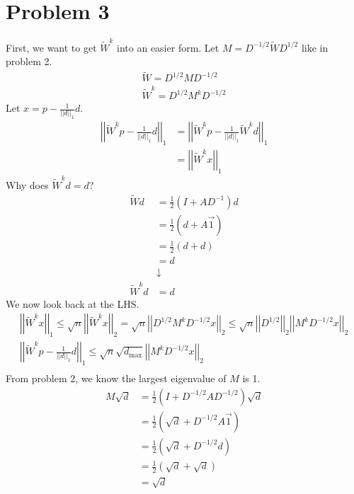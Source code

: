 \documentclass[12pt,a4paper]{article}
\begin{document}
	\section*{Problem 3}
	First, we want to get $\tilde{W}^k$ into an easier form. Let $M = D^{-1/2} \tilde{W} D^{1/2}$ like in problem 2.
	\begin{align*}
		\tilde{W} = D^{1/2} M D^{-1/2}\\
		\tilde{W}^k = D^{1/2} M^k D^{-1/2}
	\end{align*}
	Let $x = p - \frac{1}{||d||_1}d$.
	\begin{align*}
		\left|\left|\tilde{W}^k p - \frac{1}{||d||_1}d\right|\right|_1 
		&= \left|\left|\tilde{W}^k p - \frac{1}{||d||_1} \tilde{W}^k d\right|\right|_1\\
		&= \left|\left|\tilde{W}^k x\right|\right|_1
	\end{align*}
	Why does $\tilde{W}^k d = d$?
	\begin{align*}
		\tilde{W} d 
		&= \frac{1}{2} (I + A D^{-1}) d\\
		&= \frac{1}{2} (d + A \vec{1})\\
		&= \frac{1}{2} (d + d)\\
		&= d\\
		&\downarrow\\
		\tilde{W}^k d &= d
	\end{align*}
	We now look back at the LHS.
	\begin{gather*}
		\left|\left|\tilde{W}^k x\right|\right|_1 
		\leq \sqrt{n} \left|\left|\tilde{W}^k x\right|\right|_2 
		= \sqrt{n} \left|\left|D^{1/2} M^k D^{-1/2} x\right|\right|_2
		\leq \sqrt{n} \left|\left|D^{1/2}\right|\right|_2 \left|\left|M^k D^{-1/2} x\right|\right|_2\\
		\left|\left|\tilde{W}^k p - \frac{1}{||d||_1}d\right|\right|_1 
		\leq \sqrt{n} \sqrt{d_{\max}} \left|\left|M^k D^{-1/2} x\right|\right|_2\\
	\end{gather*}
	From problem 2, we know the largest eigenvalue of $M$ is 1.
	\begin{align*}
		M \sqrt{d}
		&= \frac{1}{2} (I + D^{-1/2} A D^{-1/2}) \sqrt{d}\\
		&= \frac{1}{2} (\sqrt{d} + D^{-1/2} A \vec{1})\\
		&= \frac{1}{2} (\sqrt{d} + D^{-1/2} d)\\
		&= \frac{1}{2} (\sqrt{d} + \sqrt{d})\\
		&= \sqrt{d}\\
	\end{align*}
\end{document}
